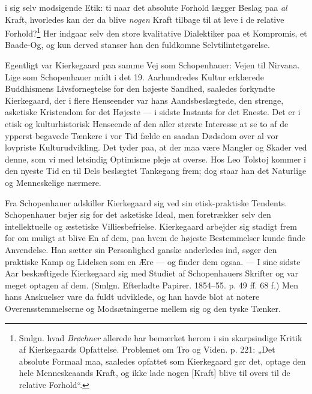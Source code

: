 \documentclass[12pt,a4paper,openany]{book}
\newcommand{\opage}[1]{\marginnote{\footnotesize\textit{[#1]}}}
\begin{document}
i sig selv modsigende Etik: ti naar det absolute Forhold
lægger Beslag paa \textit{al} Kraft, hvorledes kan der da blive
\textit{nogen} Kraft tilbage til at leve i de relative Forhold?\footnote{Smlgn. hvad \textit{Brøchner} allerede har bemærket herom i sin skarpsindige Kritik af Kierkegaards Opfattelse. Problemet om Tro og Viden. p. 221: „Det absolute Formaal maa, saaledes opfattet som Kierkegaard gør det, optage den hele Menneskeaands Kraft, og ikke lade nogen [Kraft] blive til overs til de relative Forhold“.}
Her indgaar selv den store kvalitative Dialektiker paa
et Kompromis, et Baade-Og, og kun derved stanser han
den fuldkomne Selvtilintetgørelse.

Egentligt var Kierkegaard paa samme Vej som
Schopenhauer: Vejen til Nirvana. Lige som Schopenhauer
midt i det 19. Aarhundredes Kultur erklærede
Buddhismens Livsfornegtelse for den højeste Sandhed,
saaledes forkyndte Kierkegaard, der i flere Henseender
var hans Aandsbeslægtede, den strenge, asketiske Kristendom
for det Højeste --- i sidste Instants for det Eneste.
Det er i etisk og kulturhistorisk Henseende af den aller
\opage{116}største Interesse at se to af de ypperst begavede Tænkere
i vor Tid fælde en saadan Dødsdom over al vor
lovpriste Kulturudvikling. Det tyder paa, at der maa
være Mangler og Skader ved denne, som vi med letsindig
Optimisme pleje at overse. Hos Leo Tolstoj kommer
i den nyeste Tid en til Dels beslægtet Tankegang frem;
dog staar han det Naturlige og Menneskelige nærmere.

Fra Schopenhauer adskiller Kierkegaard sig ved sin
etisk-praktiske Tendents. Schopenhauer bøjer sig for det
asketiske Ideal, men foretrækker selv den intellektuelle
og æstetiske Villiesbefrielse. Kierkegaard arbejder sig
stadigt frem for om muligt at blive En af dem, paa hvem
de højeste Bestemmelser kunde finde Anvendelse. Han
sætter sin Personlighed ganske anderledes ind, søger den
praktiske Kamp og Lidelsen som en Ære --- og finder
dem ogsaa. --- I sine sidste Aar beskæftigede Kierkegaard
sig med Studiet af Schopenhauers Skrifter og var meget
optagen af dem. (Smlgn. Efterladte Papirer. 1854--55.
p. 49 ff. 68 f.) Men hans Anskuelser vare da fuldt udviklede,
og han havde blot at notere Overensstemmelserne
og Modsætningerne mellem sig og den tyske Tænker.
\end{document}
